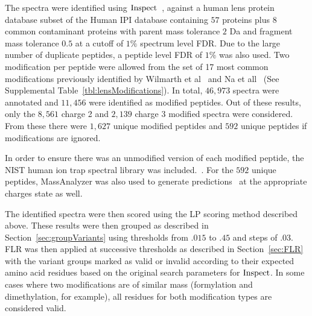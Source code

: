 \documentclass[11pt]{article}
\newcommand{\inspect}{${\rm Inspect}$}
\begin{document}
{The spectra were identified using {\inspect}~\cite{tanner05}, against a human lens protein database subset of the Human IPI database containing $57$ proteins plus $8$ common contaminant proteins with parent mass tolerance $2$ Da and fragment mass tolerance $0.5$ at a cutoff of $1\%$ spectrum level FDR. Due to the large number of duplicate peptides, a peptide level FDR of $1\%$ was also used. Two modification per peptide were allowed from the set of 17 most common modifications previously identified by Wilmarth et al~\cite{Wilmarth06} and Na et all~\cite{na11} (See Supplemental Table~\ref{tbl:lensModifications}). In total, $46,973$ spectra were annotated and $11,456$ were identified as modified peptides. Out of these results, only the $8,561$ charge 2 and $2,139$ charge 3 modified spectra were considered. From these there were $1,627$ unique modified peptides and $592$ unique peptides if modifications are ignored. 


In order to ensure there was an unmodified version of each modified peptide, the NIST human ion trap spectral library was included.~\cite{speclib_nist_human_yeast}. For the $592$ unique peptides, MassAnalyzer was also used to generate predictions~\cite{zhang04,zhang05,zhang10} at the appropriate charges state as well.

The identified spectra were then scored using the LP scoring method described above. These results were then grouped as described in Section~\ref{sec:groupVariants} using thresholds from $.015$ to $.45$ and steps of $.03$. FLR was then applied at successive thresholds as described in Section~\ref{sec:FLR} with the variant groups marked as valid or invalid according to their expected amino acid residues based on the original search parameters for {\inspect}. In some cases where two modifications are of similar mass (formylation and dimethylation, for example), all residues for both modification types are considered valid. 

}
\end{document}
